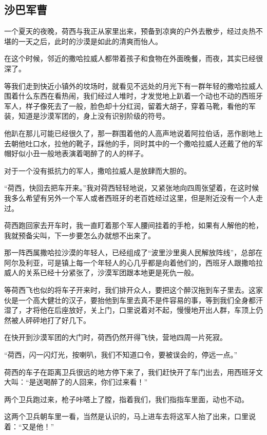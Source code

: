 \subsection{沙巴军曹}

\par 一个夏天的夜晚，荷西与我正从家里出来，预备到凉爽的户外去散步，经过炎热不堪的一天之后，此时的沙漠是如此的清爽而怡人。
\par 在这个时候，邻近的撒哈拉威人都带着孩子和食物在外面晚餐，而夜，其实已经很深了。
\par 等我们走到快近小镇外的坟场时，就看见不远处的月光下有一群年轻的撒哈拉威人围着什么东西在看热闹，我们经过人堆时，才发觉地上趴着一个动也不动的西班牙军人，样子像死去了一般，脸色却十分红润，留着大胡子，穿着马靴，看他的军装，知道是沙漠军团的，身上没有识别阶级的符号。
\par 他趴在那儿可能已经很久了，那一群围着他的人高声地说着阿拉伯话，恶作剧地上去朝他吐口水，拉他的靴子，踩他的手，同时其中的一个撒哈拉威人还戴了他的军帽好似小丑一般地表演着喝醉了的人的样子。
\par 对于一个没有抵抗力的军人，撒哈拉威人是放肆而大胆的。
\par “荷西，快回去把车开来。”我对荷西轻轻地说，又紧张地向四周张望着，在这时候我多么希望有另外一个军人或者西班牙的老百姓经过这里，但是附近没有一个人走过。
\par 荷西跑回家去开车时，我一直盯着那个军人腰间挂着的手枪，如果有人解他的枪，我就预备尖叫，下一步要怎么办就想不出来了。
\par 那一阵西属撒哈拉沙漠的年轻人，已经组成了“波里沙里奥人民解放阵线”，总部在阿尔及利亚，可是镇上每一个年轻人的心几乎都是向着他们的，西班牙人跟撒哈拉威人的关系已经十分紧张了，沙漠军团跟本地更是死仇一般。
\par 等荷西飞也似的将车子开来时，我们排开众人，要把这个醉汉拖到车子里去。这家伙是一个高大健壮的汉子，要抬他到车里去真不是件容易的事，等到我们全身都汗湿了，才将他在后座放好，关上门，口里说着对不起，慢慢地开出人群，车顶上仍然被人砰砰地打了好几下。
\par 在快开到沙漠军团的大门时，荷西仍然开得飞快，营地四周一片死寂。
\par “荷西，闪一闪灯光，按喇叭，我们不知道口令，要被误会的，停远一点。”
\par 荷西的车子在距离卫兵很远的地方停下来了，我们赶快开了车门出去，用西班牙文大叫：“是送喝醉了的人回来，你们过来看！”
\par 两个卫兵跑过来，枪子咔嗒上了膛，指着我们，我们指指车里面，动也不动。
\par 这两个卫兵朝车里一看，当然是认识的，马上进车去将这军人抬了出来，口里说着：“又是他！”
